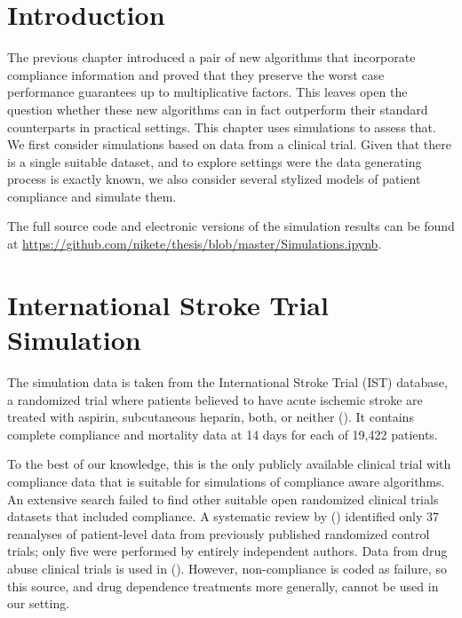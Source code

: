 
\section{Introduction}

The previous chapter introduced a pair of new algorithms that incorporate compliance information and proved that they preserve the worst case performance guarantees up to multiplicative factors.
This leaves open the question whether these new algorithms can in fact outperform their standard counterparts in practical settings. 
This chapter uses simulations to assess that. We first consider simulations based on data from a clinical trial. Given that there is a single suitable dataset, and to explore settings were the data generating process is exactly known, we also consider several stylized models of patient compliance and simulate them.

The full source code and electronic versions of the simulation results can be found at \url{https://github.com/nikete/thesis/blob/master/Simulations.ipynb}.

\section{International Stroke Trial Simulation}
\label{sec:data}

The simulation data is taken from the International Stroke Trial (IST) database, a randomized trial where patients believed to have acute ischemic stroke are treated with aspirin, subcutaneous heparin, both, or neither (\cite{ist:97}).
It contains complete compliance and mortality data at 14 days for each of 19,422 patients.

To the best of our knowledge, this is the only publicly available clinical trial with compliance data that is suitable for simulations of compliance aware algorithms.
An extensive search failed to find other suitable open randomized clinical trials datasets that included compliance. A systematic review by  (\cite{ebrahim:14}) identified only 37 reanalyses of patient-level data from previously published randomized control trials; only five were performed by entirely independent authors.
Data from drug abuse clinical trials is used in (\cite{kuleshov:14}). However, non-compliance is coded as failure, so this source, and drug dependence treatments more generally, cannot be used in our setting.  

